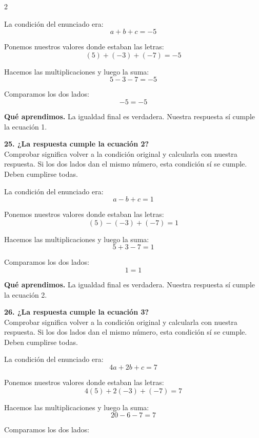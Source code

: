 \documentclass[11pt,a4paper,landscape]{article}
\begin{document}
\begin{multicols*}{2}
\begin{minipage}{\linewidth}
\par\smallskip La condición del enunciado era:
\[a + b + c = -5\]
\par\smallskip Ponemos nuestros valores donde estaban las letras:
\[\left(5\right) + \left(-3\right) + \left(-7\right)=-5\]
\par\smallskip Hacemos las multiplicaciones y luego la suma:
\[5 - 3 - 7=-5\]
\par\smallskip Comparamos los dos lados:
\[-5=-5\]
\par\smallskip\textbf{Qué aprendimos.} La igualdad final es verdadera. Nuestra respuesta sí cumple la ecuación 1.
\end{minipage}\par\medskip
\noindent\begin{minipage}{\linewidth}\textbf{25. ¿La respuesta cumple la ecuación 2?}\\[2pt]Comprobar significa volver a la condición original y calcularla con nuestra respuesta. Si los dos lados dan el mismo número, esta condición sí se cumple. Deben cumplirse todas.
\par\smallskip La condición del enunciado era:
\[a - b + c = 1\]
\par\smallskip Ponemos nuestros valores donde estaban las letras:
\[\left(5\right) - \left(-3\right) + \left(-7\right)=1\]
\par\smallskip Hacemos las multiplicaciones y luego la suma:
\[5 + 3 - 7=1\]
\par\smallskip Comparamos los dos lados:
\[1=1\]
\par\smallskip\textbf{Qué aprendimos.} La igualdad final es verdadera. Nuestra respuesta sí cumple la ecuación 2.
\end{minipage}\par\medskip
\noindent\begin{minipage}{\linewidth}\textbf{26. ¿La respuesta cumple la ecuación 3?}\\[2pt]Comprobar significa volver a la condición original y calcularla con nuestra respuesta. Si los dos lados dan el mismo número, esta condición sí se cumple. Deben cumplirse todas.
\par\smallskip La condición del enunciado era:
\[4a + 2b + c = 7\]
\par\smallskip Ponemos nuestros valores donde estaban las letras:
\[4\left(5\right) + 2\left(-3\right) + \left(-7\right)=7\]
\par\smallskip Hacemos las multiplicaciones y luego la suma:
\[20 - 6 - 7=7\]
\par\smallskip Comparamos los dos lados:

\end{minipage}
\end{multicols*}
\end{document}
